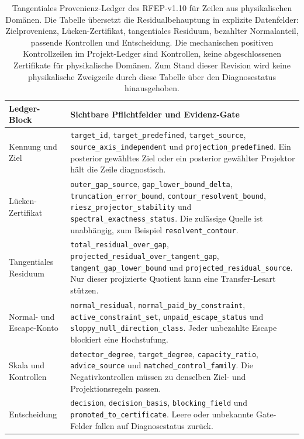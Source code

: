 \documentclass[11pt,a4paper]{article}
\theoremstyle{plain}
\theoremstyle{definition}
\begin{document}
\begin{table}[htbp]
\centering
\footnotesize
\begin{tabularx}{\textwidth}{L{0.27\textwidth}Y}
\toprule
Ledger-Block & Sichtbare Pflichtfelder und Evidenz-Gate \\
\midrule
Kennung und Ziel & \texttt{target\_id},
\texttt{target\_predefined}, \texttt{target\_source},
\texttt{source\_axis\_independent} und
\texttt{projection\_predefined}. Ein posterior gewähltes Ziel oder ein
posterior gewählter Projektor hält die Zeile diagnostisch. \\
Lücken-Zertifikat & \texttt{outer\_gap\_source},
\texttt{gap\_lower\_bound\_delta},
\texttt{truncation\_error\_bound},
\texttt{contour\_resolvent\_bound},
\texttt{riesz\_projector\_stability} und
\texttt{spectral\_exactness\_status}. Die zulässige Quelle ist
unabhängig, zum Beispiel \texttt{resolvent\_contour}. \\
Tangentiales Residuum & \texttt{total\_residual\_over\_gap},
\texttt{projected\_residual\_over\_tangent\_gap},
\texttt{tangent\_gap\_lower\_bound} und
\texttt{projected\_residual\_source}. Nur dieser projizierte Quotient
kann eine Transfer-Lesart stützen. \\
Normal- und Escape-Konto & \texttt{normal\_residual},
\texttt{normal\_paid\_by\_constraint},
\texttt{active\_constraint\_set},
\texttt{unpaid\_escape\_status} und
\texttt{sloppy\_null\_direction\_class}. Jeder unbezahlte Escape
blockiert eine Hochstufung. \\
Skala und Kontrollen & \texttt{detector\_degree},
\texttt{target\_degree}, \texttt{capacity\_ratio},
\texttt{advice\_source} und \texttt{matched\_control\_family}. Die
Negativkontrollen müssen zu denselben Ziel- und Projektionsregeln
passen. \\
Entscheidung & \texttt{decision}, \texttt{decision\_basis},
\texttt{blocking\_field} und \texttt{promoted\_to\_certificate}. Leere
oder unbekannte Gate-Felder fallen auf Diagnosestatus zurück. \\
\bottomrule
\end{tabularx}
\caption{Tangentiales Provenienz-Ledger des RFEP-v1.10 für Zeilen aus
physikalischen Domänen. Die Tabelle übersetzt die Residualbehauptung in
explizite Datenfelder: Zielprovenienz, Lücken-Zertifikat,
tangentiales Residuum, bezahlter Normalanteil, passende Kontrollen und
Entscheidung. Die mechanischen positiven Kontrollzeilen im
Projekt-Ledger sind Kontrollen, keine abgeschlossenen Zertifikate für
physikalische Domänen. Zum Stand dieser Revision wird keine
physikalische Zweigzeile durch diese Tabelle über den Diagnosestatus
hinausgehoben.}
\label{tab:rfep-v19-ledger}
\end{table}
\end{document}
